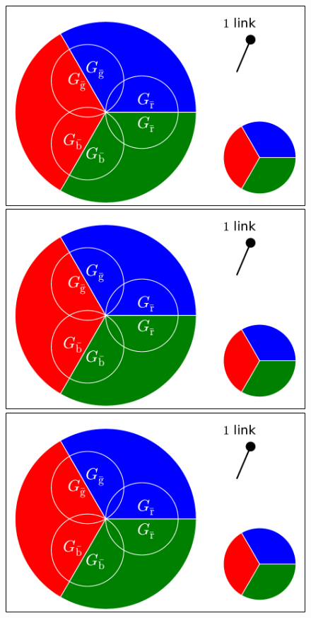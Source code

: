 \documentclass[aps, pre, onecolumn, a4paper, floatfix]{revtex4}
\begin{document}
\begin{figure}[htb]
  \begin{minipage}[b]{0.3\linewidth}
    \begin{center}
    \includegraphics[width=0.99\columnwidth]{sets_1_all.pdf}\\
    \includegraphics[width=0.99\columnwidth]{sets_1_all.pdf}\\
    \includegraphics[width=0.99\columnwidth]{sets_1_all.pdf}\\

\end{center}
\end{minipage}
\end{figure}
\end{document}
